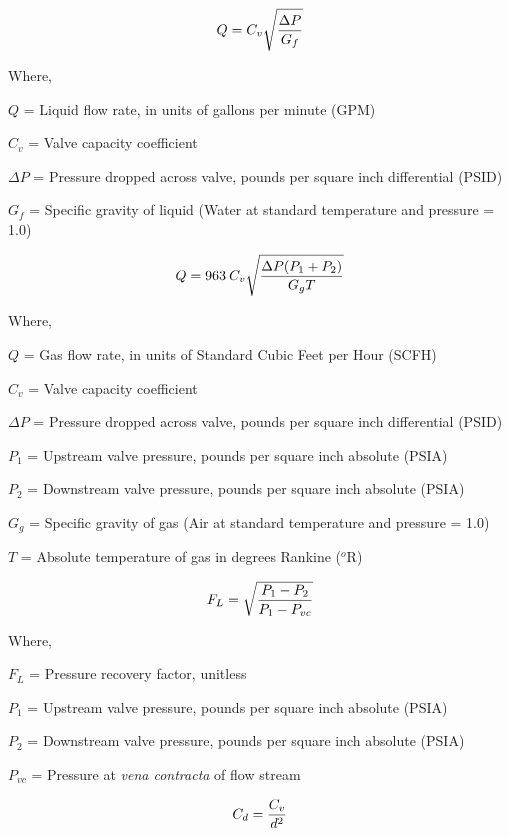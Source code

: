 

$$Q = C_v \sqrt{\Delta P \over G_f}$$

\noindent
Where,

$Q$ = Liquid flow rate, in units of gallons per minute (GPM)

$C_v$ = Valve capacity coefficient

$\Delta P$ = Pressure dropped across valve, pounds per square inch differential (PSID)

$G_f$ = Specific gravity of liquid (Water at standard temperature and pressure = 1.0)


\vskip 30pt

$$Q = 963 \> C_v \sqrt{{\Delta P (P_1 + P_2)} \over {G_g T}}$$

\noindent
Where,

$Q$ = Gas flow rate, in units of Standard Cubic Feet per Hour (SCFH)

$C_v$ = Valve capacity coefficient

$\Delta P$ = Pressure dropped across valve, pounds per square inch differential (PSID)

$P_1$ = Upstream valve pressure, pounds per square inch absolute (PSIA)

$P_2$ = Downstream valve pressure, pounds per square inch absolute (PSIA)

$G_g$ = Specific gravity of gas (Air at standard temperature and pressure = 1.0)

$T$ = Absolute temperature of gas in degrees Rankine ($^{o}$R)

\vskip 30pt


$$F_L = \sqrt{{P_1 - P_2} \over {P_1 - P_{vc}}}$$
 
\noindent
Where,

$F_L$ = Pressure recovery factor, unitless

$P_1$ = Upstream valve pressure, pounds per square inch absolute (PSIA)

$P_2$ = Downstream valve pressure, pounds per square inch absolute (PSIA)

$P_{vc}$ = Pressure at {\it vena contracta} of flow stream

\vskip 30pt

$$C_d = {C_v \over d^2}$$

